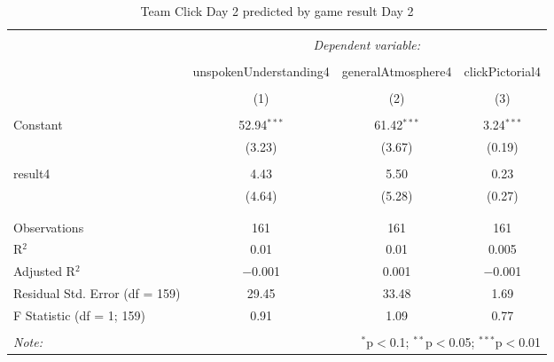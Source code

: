 
\begin{table}[!htbp] \centering 
  \caption{Team Click Day 2 predicted by game result Day 2} 
  \label{tab:teamClickDay2Result} 
\footnotesize 
\begin{tabular}{@{\extracolsep{5pt}}lccc} 
\\[-1.8ex]\hline 
\hline \\[-1.8ex] 
 & \multicolumn{3}{c}{\textit{Dependent variable:}} \\ 
\cline{2-4} 
\\[-1.8ex] & unspokenUnderstanding4 & generalAtmosphere4 & clickPictorial4 \\ 
\\[-1.8ex] & (1) & (2) & (3)\\ 
\hline \\[-1.8ex] 
 Constant & 52.94$^{***}$ & 61.42$^{***}$ & 3.24$^{***}$ \\ 
  & (3.23) & (3.67) & (0.19) \\ 
  & & & \\ 
 result4 & 4.43 & 5.50 & 0.23 \\ 
  & (4.64) & (5.28) & (0.27) \\ 
  & & & \\ 
\hline \\[-1.8ex] 
Observations & 161 & 161 & 161 \\ 
R$^{2}$ & 0.01 & 0.01 & 0.005 \\ 
Adjusted R$^{2}$ & $-$0.001 & 0.001 & $-$0.001 \\ 
Residual Std. Error (df = 159) & 29.45 & 33.48 & 1.69 \\ 
F Statistic (df = 1; 159) & 0.91 & 1.09 & 0.77 \\ 
\hline 
\hline \\[-1.8ex] 
\textit{Note:}  & \multicolumn{3}{r}{$^{*}$p$<$0.1; $^{**}$p$<$0.05; $^{***}$p$<$0.01} \\ 
\end{tabular} 
\end{table} 
